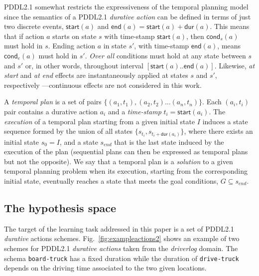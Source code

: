 \documentclass{ecai}
\newcommand{\cond}{\mathsf{cond}}  %
\newcommand{\dur}{\mathsf{dur}}    %
\newcommand{\start}{\mathsf{start}}%
\newcommand{\en}{\mathsf{end}}     %
\begin{document}
PDDL2.1 somewhat restricts the expressiveness of the temporal planning model since the semantics of a PDDL2.1 {\em durative action} can be defined in terms of just two discrete events, $\start(a)$ and $\en(a)=\start(a)+\dur(a)$. This means that if action $a$ starts on state $s$ with time-stamp $\start(a)$, then $\cond_s(a)$ must hold in $s$. Ending action $a$ in state $s'$, with time-stamp $\en(a)$, means $\cond_e(a)$ must hold in $s'$. {\em Over all} conditions must hold at any state between $s$ and $s'$ or, in other words, throughout interval $[\start(a)..\en(a)]$. Likewise, {\em at start} and {\em at end} effects are instantaneously applied at states $s$ and $s'$, respectively ---continuous effects are not considered in this work. 

A {\em temporal plan} is a set of pairs $\{(a_1,t_1),(a_2,t_2)\ldots (a_n,t_n)\}$. Each $(a_i,t_i)$ pair contains a durative action $a_i$ and a {\em time-stamp} $t_i=\start(a_i)$. The {\em execution} of a temporal plan starting from a given initial state $I$ induces a state sequence formed by the union of all states $\{s_{t_i}, s_{t_i+\dur(a_i)}\}$, where there exists an initial state $s_{0}=I$, and a state $s_{end}$ that is the last state induced by the execution of the plan (sequential plans can then be expressed as temporal plans but not the opposite). We say that a temporal plan is a {\em solution} to a given temporal planning problem when its execution, starting from the corresponding initial state, eventually reaches a state that meets the goal conditions, $G\subseteq s_{end}$.

\subsection{The hypothesis space}
\label{sec:action-space}
The target of the learning task addressed in this paper is a set of PDDL2.1 {\em durative} actions schemes. Fig.~\ref{fig:exampleactions2} shows an example of two schemes for PDDL2.1 {\em durative actions} taken from the {\em driverlog} domain. The schema \texttt{board-truck} has a fixed duration while the duration of \texttt{drive-truck} depends on the driving time associated to the two given locations.
\end{document}
